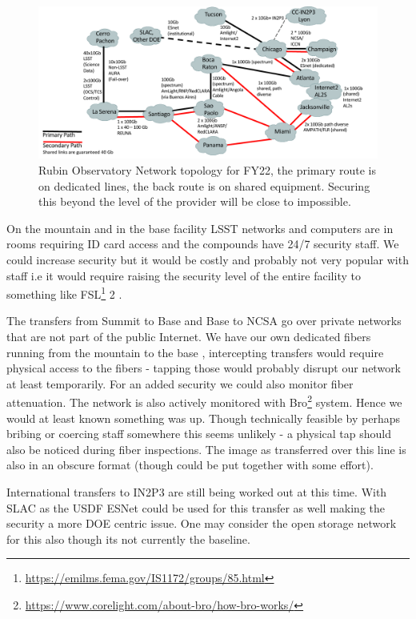 \begin{figure}
\begin{center}
\includegraphics[width=1.0\textwidth]{NetworksFY22}
\caption{Rubin Observatory Network topology for FY22, the primary route is on dedicated lines, the back route is on shared equipment. Securing this beyond the level of the provider will be close to impossible.  \label{fig:net}}
\end{center}
\end{figure}

On the mountain and in the base facility LSST networks and computers are in rooms requiring ID card access and the compounds
have 24/7 security staff.
We could increase security but it would be costly and probably not very popular with staff i.e it would require raising the security level of the entire facility to something like FSL\footnote{\url{https://emilms.fema.gov/IS1172/groups/85.html}} 2 .

The transfers from Summit to Base and Base to NCSA go over private networks that are not part of the public Internet. We have our own dedicated fibers running from the mountain to the base ,
intercepting transfers would require physical access to the fibers - tapping those would probably disrupt our network at least temporarily.
For an added security we could also monitor fiber attenuation.
The network is also actively monitored with Bro\footnote{\url{https://www.corelight.com/about-bro/how-bro-works/}} system. Hence we would at least known something was up.
Though technically feasible by perhaps bribing or coercing staff somewhere this seems unlikely - a physical tap should also be noticed during fiber inspections.  The image as transferred over this line is also in an obscure format (though could be put together with some effort).


International transfers to IN2P3 are still being worked out at this time.
With SLAC as the USDF  ESNet could be used for this transfer as well making the security a more DOE centric issue.
 One may consider the open storage network \citep{osn} for this also though its not currently the baseline.


